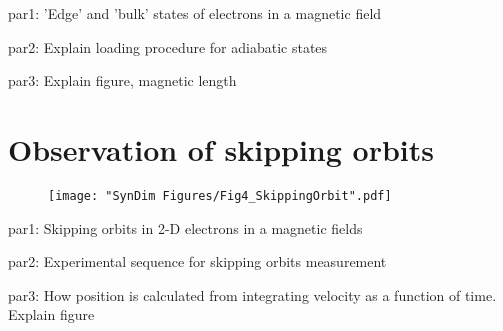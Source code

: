 par1: 'Edge' and 'bulk' states of electrons in a magnetic field

par2: Explain loading procedure for adiabatic states

par3: Explain figure, magnetic length

\section{Observation of skipping orbits}

\begin{figure}
	\texttt{[image: "SynDim Figures/Fig4\_SkippingOrbit".pdf]}
\caption{}
\label{fig:skippingOrbits}
\end{figure}

par1: Skipping orbits in 2-D electrons in a magnetic fields

par2: Experimental sequence for skipping orbits measurement

par3: How position is calculated from integrating velocity as a function of time. Explain figure